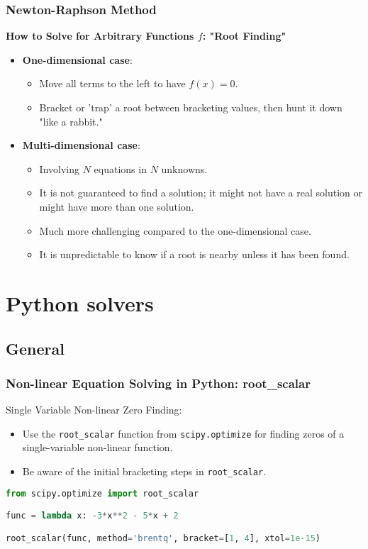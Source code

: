 \begin{frame}[fragile]
    \frametitle{Newton-Raphson Method}
    \textbf{How to Solve for Arbitrary Functions \( f \): "Root Finding"}
    \begin{itemize}
        \item \textbf{One-dimensional case}:
            \begin{itemize}
                \item Move all terms to the left to have \( f(x) = 0 \).
                \item Bracket or 'trap' a root between bracketing values, then hunt it down "like a rabbit."
            \end{itemize}
        
        \item \textbf{Multi-dimensional case}:
            \begin{itemize}
                \item Involving \( N \) equations in \( N \) unknowns.
                \item It is not guaranteed to find a solution; it might not have a real solution or might have more than one solution.
                \item Much more challenging compared to the one-dimensional case.
                \item It is unpredictable to know if a root is nearby unless it has been found.
            \end{itemize}
    \end{itemize}
\end{frame}


\section{Python solvers}
\subsection*{General}

\begin{frame}[fragile]
  \frametitle{Non-linear Equation Solving in Python: root_scalar}

  Single Variable Non-linear Zero Finding:
  \begin{itemize}
      \item Use the \lstinline|root_scalar| function from \lstinline|scipy.optimize| for finding zeros of a single-variable non-linear function.
      \item Be aware of the initial bracketing steps in \lstinline|root_scalar|.
  \end{itemize}

  \begin{lstlisting}[language=Python]
from scipy.optimize import root_scalar

func = lambda x: -3*x**2 - 5*x + 2

root_scalar(func, method='brentq', bracket=[1, 4], xtol=1e-15)
  \end{lstlisting}
  
\end{frame}

